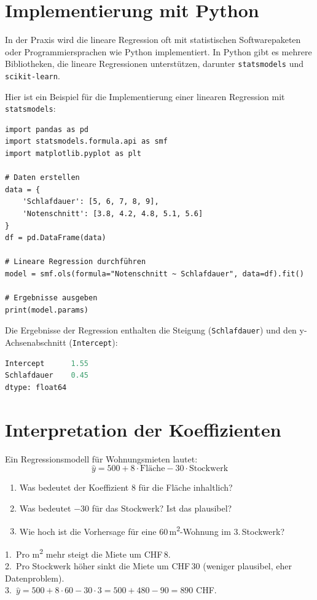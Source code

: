 \section{Implementierung mit Python}

In der Praxis wird die lineare Regression oft mit statistischen Softwarepaketen oder Programmiersprachen wie Python implementiert. In Python gibt es mehrere Bibliotheken, die lineare Regressionen unterstützen, darunter \texttt{statsmodels} und \texttt{scikit-learn}.

Hier ist ein Beispiel für die Implementierung einer linearen Regression mit \texttt{statsmodels}:

\begin{lstlisting}
import pandas as pd
import statsmodels.formula.api as smf
import matplotlib.pyplot as plt

# Daten erstellen
data = {
    'Schlafdauer': [5, 6, 7, 8, 9],
    'Notenschnitt': [3.8, 4.2, 4.8, 5.1, 5.6]
}
df = pd.DataFrame(data)

# Lineare Regression durchführen
model = smf.ols(formula="Notenschnitt ~ Schlafdauer", data=df).fit()

# Ergebnisse ausgeben
print(model.params)
\end{lstlisting}

Die Ergebnisse der Regression enthalten die Steigung (\texttt{Schlafdauer}) und den y-Achsenabschnitt (\texttt{Intercept}):

\begin{lstlisting}[language=Python]
Intercept      1.55
Schlafdauer    0.45
dtype: float64
\end{lstlisting}

\section{Interpretation der Koeffizienten}

\begin{myexercise}
Ein Regressionsmodell für Wohnungsmieten lautet:
\[
\hat{y} = 500 + 8 \cdot \text{Fläche} - 30 \cdot \text{Stockwerk}
\]
\begin{enumerate}
    \item Was bedeutet der Koeffizient $8$ für die Fläche inhaltlich?
    \item Was bedeutet $-30$ für das Stockwerk? Ist das plausibel?
    \item Wie hoch ist die Vorhersage für eine 60\,m\textsuperscript{2}-Wohnung im 3.\,Stockwerk?
\end{enumerate}
\begin{myanswer}
1.\ Pro m\textsuperscript{2} mehr steigt die Miete um CHF\,8. \\
2.\ Pro Stockwerk höher sinkt die Miete um CHF\,30 (weniger plausibel, eher Datenproblem). \\
3.\ $\hat{y} = 500 + 8 \cdot 60 - 30 \cdot 3 = 500 + 480 - 90 = 890$ CHF.
\end{myanswer}
\end{myexercise}

